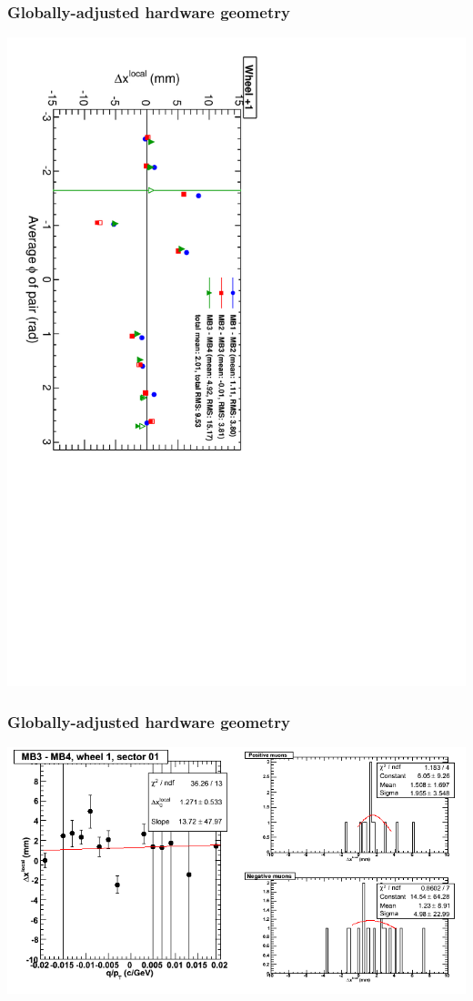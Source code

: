 \documentclass[compress]{beamer}
\begin{document}
\begin{frame}
\frametitle{Globally-adjusted hardware geometry}
\includegraphics[height=\linewidth, angle=90]{NOV4_segdiff_HW_x_whp1.pdf}
\end{frame}

\begin{frame}
\frametitle{Globally-adjusted hardware geometry}
\includegraphics[width=\linewidth]{NOV4_segdiffs_HW/dt13_resid_D_01_34.png}
\end{frame}
\end{document}
